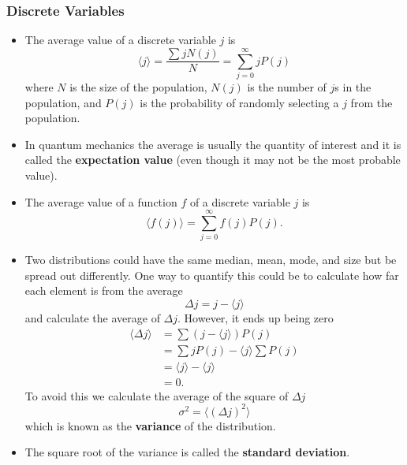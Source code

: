 \documentclass{article}
\newcommand{\ev}[1]{\langle #1 \rangle}
\begin{document}
\subsubsection{Discrete Variables}

\begin{itemize}
  \item The average value of a discrete variable $j$ is \[\ev{j} = \frac{\sum j N(j)}{N} = \sum_{j = 0}^\infty j P(j)\] where $N$ is the size of the population, $N(j)$ is the number of $j$s in the population, and $P(j)$ is the probability of randomly selecting a $j$ from the population.

  \item In quantum mechanics the average is usually the quantity of interest and it is called the \textbf{expectation value} (even though it may not be the most probable value).

  \item The average value of a function $f$ of a discrete variable $j$ is \[\ev{f(j)} = \sum_{j = 0}^\infty f(j) P(j).\]

  \item Two distributions could have the same median, mean, mode, and size but be spread out differently. One way to quantify this could be to calculate how far each element is from the average \[\Delta j = j - \ev{j}\] and calculate the average of $\Delta j$. However, it ends up being zero \begin{align*}
          \langle \Delta j \rangle & = \sum (j - \ev{j}) P(j)         \\
                                   & = \sum j P(j) - \ev{j} \sum P(j) \\
                                   & = \ev{j} - \ev{j}                \\
                                   & = 0.
        \end{align*} To avoid this we calculate the average of the square of $\Delta j$ \[\sigma^2 = \langle (\Delta j)^2 \rangle\] which is known as the \textbf{variance} of the distribution.

  \item The square root of the variance is called the \textbf{standard deviation}.


\end{itemize}
\end{document}

